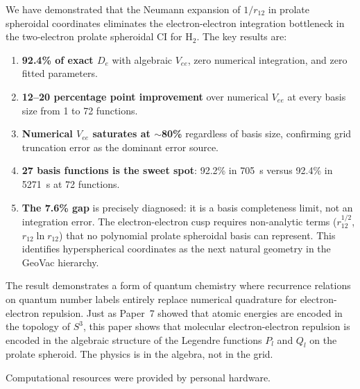 \documentclass[aps,pra,twocolumn,superscriptaddress,longbibliography]{revtex4-2}
\begin{document}
We have demonstrated that the Neumann expansion of $1/r_{12}$
in prolate spheroidal coordinates eliminates the electron-electron
integration bottleneck in the two-electron prolate spheroidal CI
for H$_2$.  The key results are:

\begin{enumerate}
  \item \textbf{92.4\% of exact $D_e$} with algebraic $V_{ee}$,
    zero numerical integration, and zero fitted parameters.
  \item \textbf{12--20 percentage point improvement} over numerical
    $V_{ee}$ at every basis size from 1 to 72 functions.
  \item \textbf{Numerical $V_{ee}$ saturates at $\sim$80\%}
    regardless of basis size, confirming grid truncation error
    as the dominant error source.
  \item \textbf{27 basis functions is the sweet spot}: 92.2\%
    in 705~s versus 92.4\% in 5271~s at 72 functions.
  \item \textbf{The 7.6\% gap} is precisely diagnosed: it is
    a basis completeness limit, not an integration error.  The
    electron-electron cusp requires non-analytic terms
    ($r_{12}^{1/2}$, $r_{12}\ln r_{12}$) that no polynomial
    prolate spheroidal basis can represent.  This identifies
    hyperspherical coordinates as the next natural geometry
    in the GeoVac hierarchy.
\end{enumerate}

The result demonstrates a form of quantum chemistry where
recurrence relations on quantum number labels entirely replace
numerical quadrature for electron-electron repulsion.  Just as
Paper~7 showed that atomic energies are encoded in the
topology of $S^3$, this paper shows that molecular
electron-electron repulsion is encoded in the algebraic
structure of the Legendre functions $P_l$ and $Q_l$ on the
prolate spheroid.  The physics is in the algebra, not in the
grid.


\begin{acknowledgments}
Computational resources were provided by personal hardware.
\end{acknowledgments}

\end{document}

